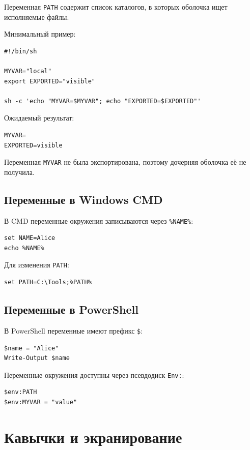 \documentclass[12pt,a4paper]{article}
\begin{document}
Переменная \texttt{PATH} содержит список каталогов, в которых оболочка ищет исполняемые файлы.

Минимальный пример:

\begin{lstlisting}
#!/bin/sh

MYVAR="local"
export EXPORTED="visible"

sh -c 'echo "MYVAR=$MYVAR"; echo "EXPORTED=$EXPORTED"'
\end{lstlisting}

Ожидаемый результат:

\begin{lstlisting}
MYVAR=
EXPORTED=visible
\end{lstlisting}

Переменная \texttt{MYVAR} не была экспортирована, поэтому дочерняя оболочка её не получила.

\subsection{Переменные в Windows CMD}

В CMD переменные окружения записываются через \texttt{\%NAME\%}:

\begin{lstlisting}
set NAME=Alice
echo %NAME%
\end{lstlisting}

Для изменения \texttt{PATH}:

\begin{lstlisting}
set PATH=C:\Tools;%PATH%
\end{lstlisting}

\subsection{Переменные в PowerShell}

В PowerShell переменные имеют префикс \texttt{\$}:

\begin{lstlisting}
$name = "Alice"
Write-Output $name
\end{lstlisting}

Переменные окружения доступны через псевдодиск \texttt{Env:}:

\begin{lstlisting}
$env:PATH
$env:MYVAR = "value"
\end{lstlisting}

\section{Кавычки и экранирование}
\end{document}
